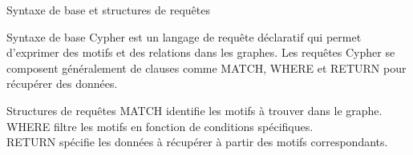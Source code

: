 \begin{frame}{Syntaxe de base et structures de requêtes}
  \begin{block}{Syntaxe de base}
    Cypher est un langage de requête déclaratif qui permet d'exprimer des motifs et des relations dans les graphes. Les requêtes Cypher se composent généralement de clauses comme MATCH, WHERE et RETURN pour récupérer des données.
  \end{block}
  \begin{block}{Structures de requêtes}
    MATCH identifie les motifs à trouver dans le graphe. \\
    WHERE filtre les motifs en fonction de conditions spécifiques. \\
    RETURN spécifie les données à récupérer à partir des motifs correspondants.
  \end{block}
\end{frame}